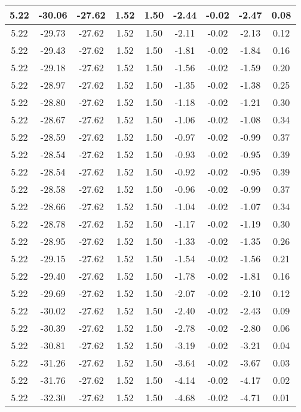 \begin{table}[htbp]
\begin{adjustbox}{angle=90}
\begin{tabular}{|c|c|c|c|c|c|c|c|c|}
 5.22 & -30.06 & -27.62 & 1.52 & 1.50 & -2.44 & -0.02 & -2.47 & 0.08\\ \hline
 5.22 & -29.73 & -27.62 & 1.52 & 1.50 & -2.11 & -0.02 & -2.13 & 0.12\\ \hline
 5.22 & -29.43 & -27.62 & 1.52 & 1.50 & -1.81 & -0.02 & -1.84 & 0.16\\ \hline
 5.22 & -29.18 & -27.62 & 1.52 & 1.50 & -1.56 & -0.02 & -1.59 & 0.20\\ \hline
 5.22 & -28.97 & -27.62 & 1.52 & 1.50 & -1.35 & -0.02 & -1.38 & 0.25\\ \hline
 5.22 & -28.80 & -27.62 & 1.52 & 1.50 & -1.18 & -0.02 & -1.21 & 0.30\\ \hline
 5.22 & -28.67 & -27.62 & 1.52 & 1.50 & -1.06 & -0.02 & -1.08 & 0.34\\ \hline
 5.22 & -28.59 & -27.62 & 1.52 & 1.50 & -0.97 & -0.02 & -0.99 & 0.37\\ \hline
 5.22 & -28.54 & -27.62 & 1.52 & 1.50 & -0.93 & -0.02 & -0.95 & 0.39\\ \hline
 5.22 & -28.54 & -27.62 & 1.52 & 1.50 & -0.92 & -0.02 & -0.95 & 0.39\\ \hline
 5.22 & -28.58 & -27.62 & 1.52 & 1.50 & -0.96 & -0.02 & -0.99 & 0.37\\ \hline
 5.22 & -28.66 & -27.62 & 1.52 & 1.50 & -1.04 & -0.02 & -1.07 & 0.34\\ \hline
 5.22 & -28.78 & -27.62 & 1.52 & 1.50 & -1.17 & -0.02 & -1.19 & 0.30\\ \hline
 5.22 & -28.95 & -27.62 & 1.52 & 1.50 & -1.33 & -0.02 & -1.35 & 0.26\\ \hline
 5.22 & -29.15 & -27.62 & 1.52 & 1.50 & -1.54 & -0.02 & -1.56 & 0.21\\ \hline
 5.22 & -29.40 & -27.62 & 1.52 & 1.50 & -1.78 & -0.02 & -1.81 & 0.16\\ \hline
 5.22 & -29.69 & -27.62 & 1.52 & 1.50 & -2.07 & -0.02 & -2.10 & 0.12\\ \hline
 5.22 & -30.02 & -27.62 & 1.52 & 1.50 & -2.40 & -0.02 & -2.43 & 0.09\\ \hline
 5.22 & -30.39 & -27.62 & 1.52 & 1.50 & -2.78 & -0.02 & -2.80 & 0.06\\ \hline
 5.22 & -30.81 & -27.62 & 1.52 & 1.50 & -3.19 & -0.02 & -3.21 & 0.04\\ \hline
 5.22 & -31.26 & -27.62 & 1.52 & 1.50 & -3.64 & -0.02 & -3.67 & 0.03\\ \hline
 5.22 & -31.76 & -27.62 & 1.52 & 1.50 & -4.14 & -0.02 & -4.17 & 0.02\\ \hline
 5.22 & -32.30 & -27.62 & 1.52 & 1.50 & -4.68 & -0.02 & -4.71 & 0.01\\ \hline

\end{tabular}
\end{adjustbox}
\end{table}

